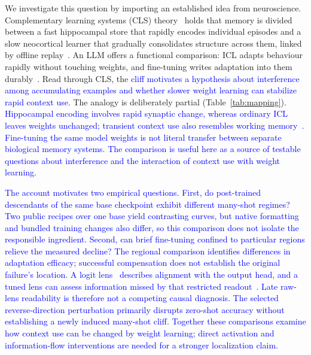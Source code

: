 \documentclass[pdflatex, sn-nature]{sn-jnl}%
\theoremstyle{thmstyleone}%
\theoremstyle{thmstyletwo}%
\theoremstyle{thmstylethree}%
\begin{document}
We investigate this question by importing an established idea from neuroscience.
Complementary learning systems (CLS) theory~\cite{mcclelland1995cls,kumaran2016cls,oreilly2014cls}
holds that memory is divided between a fast hippocampal store that rapidly encodes
individual episodes and a slow neocortical learner that gradually consolidates structure
across them, linked by offline replay~\cite{diekelmann2010sleep,liao2024hippocampus}.
An LLM offers a functional comparison: ICL adapts behaviour rapidly without touching
weights, and fine-tuning writes adaptation into them durably~\cite{hu2022lora}.
Read through CLS, the \textcolor{blue}{cliff motivates a hypothesis about interference among accumulating
examples and whether slower weight learning can stabilize rapid context use}. The
analogy is deliberately partial (Table~\ref{tab:mapping})\textcolor{blue}{. Hippocampal encoding
involves rapid synaptic change, whereas ordinary ICL leaves weights unchanged;
transient context use also resembles working memory}~\textcolor{blue}{\cite{cowan2001capacity}}\textcolor{blue}{.
Fine-tuning the same model weights is not literal transfer between separate biological
memory systems. The comparison is useful here as a source of testable questions about
interference and the interaction of context use with weight learning.}

\textcolor{blue}{The account motivates two empirical questions. First, do post-trained descendants of
the same base checkpoint exhibit different many-shot regimes? Two public recipes over
one base yield contrasting curves, but native formatting and bundled training changes
also differ, so this comparison does not isolate the responsible ingredient. Second,
can brief fine-tuning confined to particular regions relieve the measured decline?
The regional comparison identifies differences in adaptation efficacy; successful
compensation does not establish the original failure's location. A logit
lens}~\textcolor{blue}{\cite{nostalgebraist2020logit}} \textcolor{blue}{describes alignment with the output head, and a
tuned lens can assess information missed by that restricted
readout}~\textcolor{blue}{\cite{belrose2023tunedlens}}\textcolor{blue}{. Late raw-lens readability is therefore not a
competing causal diagnosis. The selected reverse-direction perturbation primarily
disrupts zero-shot accuracy without establishing a newly induced many-shot cliff.
Together these comparisons examine how context use can be changed by weight learning;
direct activation and information-flow interventions are needed for a stronger
localization claim.}
\end{document}

